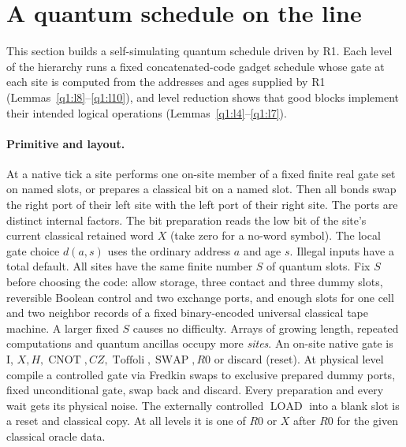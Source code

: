 \section{A quantum schedule on the line}\label{q1:compiler}
This section builds a self-simulating quantum schedule driven by R1. Each level of the hierarchy runs a fixed concatenated-code gadget schedule whose gate at each site is computed from the addresses and ages supplied by R1 (Lemmas~\ref{q1:l8}--\ref{q1:l10}), and level reduction shows that good blocks implement their intended logical operations (Lemmas~\ref{q1:l4}--\ref{q1:l7}).

\paragraph{Primitive and layout.}

At a native tick a site performs one on-site member of a fixed finite real gate set on named slots, or prepares a classical bit on a named slot. Then all bonds swap the right port of their left site with the left port of their right site. The ports are distinct internal factors. The bit preparation reads the low bit of the site's current classical retained word \(X\) (take zero for a no-word symbol). The local gate choice \(d(a,s)\) uses the ordinary address \(a\) and age \(s\). Illegal inputs have a total default. All sites have the same finite number \(S\) of quantum slots. Fix \(S\) before choosing the code: allow storage, three contact and three dummy slots, reversible Boolean control and two exchange ports, and enough slots for one cell and two neighbor records of a fixed binary-encoded universal classical tape machine. A larger fixed \(S\) causes no difficulty. Arrays of growing length, repeated computations and quantum ancillas occupy more \emph{sites}. An on-site native gate is I, \(X, H, \operatorname{CNOT}, CZ, \operatorname{Toffoli}, \operatorname{SWAP}, R0\) or discard (reset). At physical level compile a controlled gate via Fredkin swaps to exclusive prepared dummy ports, fixed unconditional gate, swap back and discard. Every preparation and every wait gets its physical noise. The externally controlled \(\operatorname{LOAD}\) into a blank slot is a reset and classical copy. At all levels it is one of \(R0\) or \(X\) after \(R0\) for the given classical oracle data.

